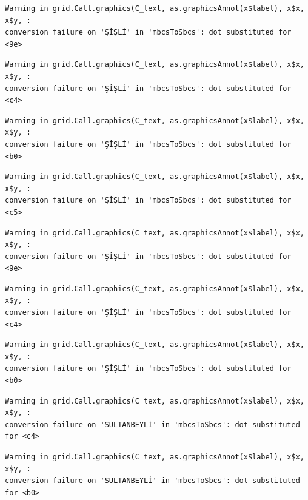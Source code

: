\documentclass[
  11pt,
  a4paper,
  DIV=11,
  numbers=noendperiod]{scrartcl}
\begin{document}
\begin{verbatim}
Warning in grid.Call.graphics(C_text, as.graphicsAnnot(x$label), x$x, x$y, :
conversion failure on 'ŞİŞLİ' in 'mbcsToSbcs': dot substituted for <9e>
\end{verbatim}

\begin{verbatim}
Warning in grid.Call.graphics(C_text, as.graphicsAnnot(x$label), x$x, x$y, :
conversion failure on 'ŞİŞLİ' in 'mbcsToSbcs': dot substituted for <c4>
\end{verbatim}

\begin{verbatim}
Warning in grid.Call.graphics(C_text, as.graphicsAnnot(x$label), x$x, x$y, :
conversion failure on 'ŞİŞLİ' in 'mbcsToSbcs': dot substituted for <b0>
\end{verbatim}

\begin{verbatim}
Warning in grid.Call.graphics(C_text, as.graphicsAnnot(x$label), x$x, x$y, :
conversion failure on 'ŞİŞLİ' in 'mbcsToSbcs': dot substituted for <c5>
\end{verbatim}

\begin{verbatim}
Warning in grid.Call.graphics(C_text, as.graphicsAnnot(x$label), x$x, x$y, :
conversion failure on 'ŞİŞLİ' in 'mbcsToSbcs': dot substituted for <9e>
\end{verbatim}

\begin{verbatim}
Warning in grid.Call.graphics(C_text, as.graphicsAnnot(x$label), x$x, x$y, :
conversion failure on 'ŞİŞLİ' in 'mbcsToSbcs': dot substituted for <c4>
\end{verbatim}

\begin{verbatim}
Warning in grid.Call.graphics(C_text, as.graphicsAnnot(x$label), x$x, x$y, :
conversion failure on 'ŞİŞLİ' in 'mbcsToSbcs': dot substituted for <b0>
\end{verbatim}

\begin{verbatim}
Warning in grid.Call.graphics(C_text, as.graphicsAnnot(x$label), x$x, x$y, :
conversion failure on 'SULTANBEYLİ' in 'mbcsToSbcs': dot substituted for <c4>
\end{verbatim}

\begin{verbatim}
Warning in grid.Call.graphics(C_text, as.graphicsAnnot(x$label), x$x, x$y, :
conversion failure on 'SULTANBEYLİ' in 'mbcsToSbcs': dot substituted for <b0>
\end{verbatim}
\end{document}
